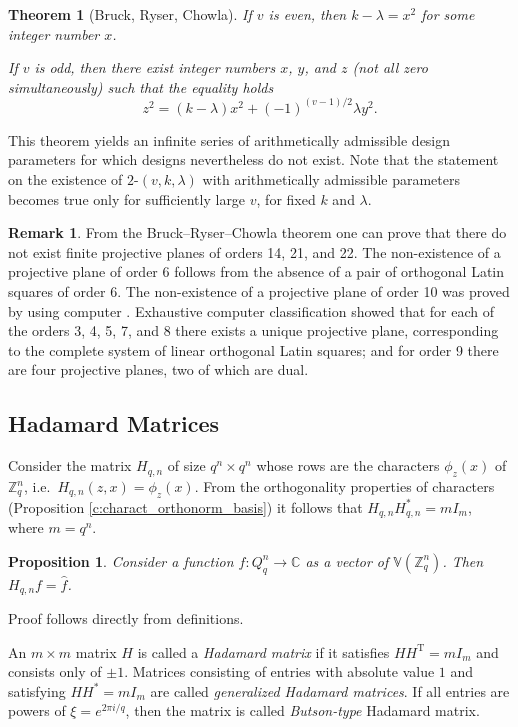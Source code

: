 \documentclass[11pt]{article}
\newtheorem{theorem}{Theorem}[section]
\newtheorem{claim}{Proposition}[section]
\theoremstyle{definition}
\newtheorem{remark}{Remark}[section]
\begin{document}
{{{\begin{theorem}[Bruck, Ryser, Chowla]
If $v$ is even, then $k-\lambda=x^2$ for some integer number $x$.

If $v$ is odd, then there exist integer numbers $x$, $y$, and
$z$ (not all zero simultaneously) such that the equality holds
$$z^2=(k-\lambda)x^2+(-1)^{(v-1)/2}\lambda y^2.$$
\end{theorem}

This theorem yields an infinite series of arithmetically
    admissible design parameters for which designs nevertheless do not exist.
 Note that the statement on the existence of $2$-$(v,k,\lambda)$ with arithmetically admissible parameters \cite{Wilson} becomes
        true only for sufficiently large $v$, for fixed $k$ and $\lambda$.

\begin{remark}
From the Bruck--Ryser--Chowla theorem one can prove that there do not
exist finite projective planes of orders 14, 21, and 22.
The non-existence of a projective plane of order 6 follows from the
absence of a pair of orthogonal Latin squares of order 6.
 The non-existence of a projective plane of order 10 was proved by using computer \cite{Lam}. 
Exhaustive computer classification \cite{LamKol} showed
 that for each of the orders 3, 4, 5, 7, and 8 there exists a
unique projective plane, corresponding to the complete system of
linear orthogonal Latin squares; and for order 9 there are
four projective planes, two of which are dual.
\end{remark}



\subsection{Hadamard Matrices}\label{10.3}

Consider the matrix $H_{q,n}$ of size $q^n\times q^n$ whose rows are the characters $\phi_z(x)$ of ${\mathbb Z}^n_q$, i.e.\ $H_{q,n}(z,x)=\phi_z(x)$. From the orthogonality properties of characters (Proposition \ref{c:charact_orthonorm_basis}) it follows that $H_{q,n}H_{q,n}^*=mI_m$, where $m=q^n$. 

\begin{claim}
Consider a function $f:Q^n_q\rightarrow {\mathbb C}$ as a vector of $ {\mathbb V}({\mathbb Z}^n_q)$.  Then 
$H_{q,n}f=\widehat{f}$. 
\end{claim}
Proof follows directly from definitions.

  An $m\times m$ matrix $H$ is called a {\sl Hadamard matrix} if it satisfies
  $HH^{\mathrm{T}}=mI_m$ and consists only of $\pm 1$.
  Matrices consisting of entries with absolute value $1$ and satisfying
  $HH^{*}=mI_m$ are called {\sl generalized Hadamard matrices}. If all entries  are
    powers of $\xi=e^{2\pi i/q}$, then the matrix is called {\sl Butson-type}  Hadamard matrix. 

}}}
\end{document}
